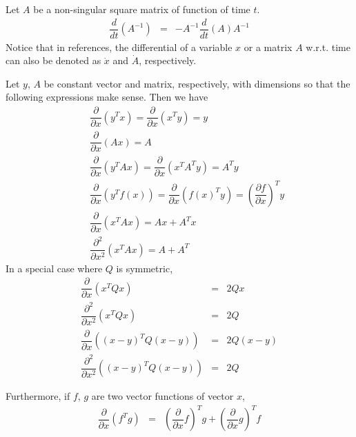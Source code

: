Let $A$ be a non-singular square matrix of function of time $t$.
\begin{eqnarray}
  \dfrac{d}{dt}\left(A^{-1}\right) &=& -A^{-1}\dfrac{d}{dt}\left(A\right)A^{-1} \nonumber
\end{eqnarray}
Notice that in references, the differential of a variable $x$ or a matrix $A$ w.r.t. time can also be denoted as $\dot{x}$ and $\dot{A}$, respectively.

Let $y$, $A$ be constant vector and matrix, respectively, with dimensions so that the following expressions make sense. Then we have
\begin{eqnarray}
  && \dfrac{\partial}{\partial x}\left(y^Tx\right) = \dfrac{\partial}{\partial x}\left(x^Ty\right) = y \nonumber \\
  && \dfrac{\partial}{\partial x}\left(Ax\right) = A \nonumber \\
  && \dfrac{\partial}{\partial x}\left(y^TAx\right) = \dfrac{\partial}{\partial x}\left(x^TA^Ty\right) = A^Ty \nonumber \\
  && \dfrac{\partial}{\partial x}\left(y^Tf(x)\right) = \dfrac{\partial}{\partial x}\left(f(x)^Ty\right) = \left(\dfrac{\partial f}{\partial x}\right)^Ty \nonumber \\
  && \dfrac{\partial}{\partial x}\left(x^TAx\right) = Ax + A^T x \nonumber \\
  && \dfrac{\partial^2}{\partial x^2}\left(x^TAx\right) = A + A^T \nonumber
\end{eqnarray}
In a special case where $Q$ is symmetric,
\begin{eqnarray}
  \dfrac{\partial}{\partial x}\left(x^TQx\right) &=& 2Qx \nonumber \\
  \dfrac{\partial^2}{\partial x^2}\left(x^TQx\right) &=& 2Q \nonumber \\
  \dfrac{\partial}{\partial x}\left((x-y)^TQ(x-y)\right) &=& 2Q(x-y) \nonumber \\
  \dfrac{\partial^2}{\partial x^2}\left((x-y)^TQ(x-y)\right) &=& 2Q \nonumber
\end{eqnarray}

Furthermore, if $f$, $g$ are two vector functions of vector $x$,
\begin{eqnarray}
  \dfrac{\partial}{\partial x}\left(f^Tg\right) &=& \left(\dfrac{\partial}{\partial x}f\right)^Tg + \left(\dfrac{\partial}{\partial x}g\right)^Tf \nonumber
\end{eqnarray}
